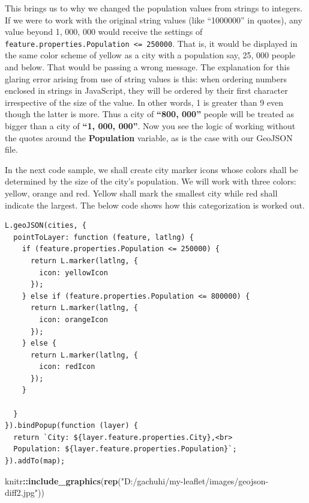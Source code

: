 \documentclass[
]{book}
\newenvironment{Shaded}{\begin{snugshade}}{\end{snugshade}}
\newcommand{\FunctionTok}[1]{\textcolor[rgb]{0.13,0.29,0.53}{\textbf{#1}}}
\newcommand{\NormalTok}[1]{#1}
\newcommand{\SpecialCharTok}[1]{\textcolor[rgb]{0.81,0.36,0.00}{\textbf{#1}}}
\newcommand{\StringTok}[1]{\textcolor[rgb]{0.31,0.60,0.02}{#1}}
\begin{document}
This brings us to why we changed the population values from strings to integers. If we were to work with the original string values (like ``1000000'' in quotes), any value beyond 1, 000, 000 would receive the settings of \texttt{feature.properties.Population\ \textless{}=\ 250000}. That is, it would be displayed in the same color scheme of yellow as a city with a population say, 25, 000 people and below. That would be passing a wrong message. The explanation for this glaring error arising from use of string values is this: when ordering numbers enclosed in strings in JavaScript, they will be ordered by their first character irrespective of the size of the value. In other words, 1 is greater than 9 even though the latter is more. Thus a city of \textbf{``\textbf{800, 000}''} people will be treated as bigger than a city of \textbf{``\textbf{1, 000, 000}''}. Now you see the logic of working without the quotes around the \textbf{Population} variable, as is the case with our GeoJSON file.

In the next code sample, we shall create city marker icons whose colors shall be determined by the size of the city's population. We will work with three colors: yellow, orange and red. Yellow shall mark the smallest city while red shall indicate the largest. The below code shows how this categorization is worked out.

\begin{verbatim}
L.geoJSON(cities, {
  pointToLayer: function (feature, latlng) {
    if (feature.properties.Population <= 250000) {
      return L.marker(latlng, {
        icon: yellowIcon 
      });
    } else if (feature.properties.Population <= 800000) {
      return L.marker(latlng, {
        icon: orangeIcon 
      });
    } else {
      return L.marker(latlng, {
        icon: redIcon 
      });
    }
    
  }
}).bindPopup(function (layer) {
  return `City: ${layer.feature.properties.City},<br>
  Population: ${layer.feature.properties.Population}`;
}).addTo(map);
\end{verbatim}

\begin{Shaded}
\begin{Highlighting}[]
\NormalTok{knitr}\SpecialCharTok{::}\FunctionTok{include\_graphics}\NormalTok{(}\FunctionTok{rep}\NormalTok{(}\StringTok{"D:/gachuhi/my{-}leaflet/images/geojson{-}diff2.jpg"}\NormalTok{))}
\end{Highlighting}
\end{Shaded}
\end{document}
